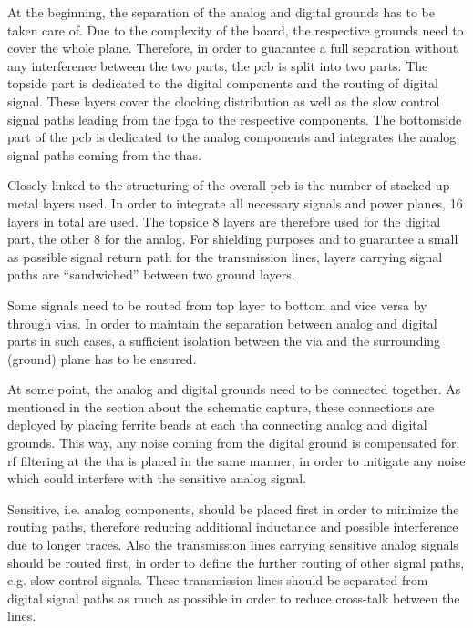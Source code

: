 At the beginning, the separation of the analog and digital grounds has to be taken care of. 
Due to the complexity of the board, the respective grounds need to cover the whole plane. 
Therefore, in order to guarantee a full separation without any interference between the two parts, the \gls{pcb} is split into two parts.
The topside part is dedicated to the digital components and the routing of digital signal. 
These layers cover the clocking distribution as well as the slow control signal paths leading from the \gls{fpga} to the respective components.
The bottomside part of the \gls{pcb} is dedicated to the analog components and integrates the analog signal paths coming from the \glspl{tha}.

Closely linked to the structuring of the overall \gls{pcb} is the number of stacked-up metal layers used.
In order to integrate all necessary signals and power planes, 16 layers in total are used.
The topside 8 layers are therefore used for the digital part, the other 8 for the analog.
For shielding purposes and to guarantee a small as possible signal return path for the transmission lines, layers carrying signal paths are ``sandwiched'' between two ground layers.

Some signals need to be routed from top layer to bottom and vice versa by through vias. 
In order to maintain the separation between analog and digital parts in such cases, a sufficient isolation between the via and the surrounding (ground) plane has to be ensured.

At some point, the analog and digital grounds need to be connected together. 
As mentioned in the section about the schematic capture, these connections are deployed by placing ferrite beads at each \gls{tha} connecting analog and digital grounds.
This way, any noise coming from the digital ground is compensated for. 
\gls{rf} filtering at the \gls{tha} is placed in the same manner, in order to mitigate any noise which could interfere with the sensitive analog signal.

Sensitive, i.e. analog components, should be placed first in order to minimize the routing paths, therefore reducing additional inductance and possible interference due to longer traces.
Also the transmission lines carrying sensitive analog signals should be routed first, in order to define the further routing of other signal paths, e.g. slow control signals. 
These transmission lines should be separated from digital signal paths as much as possible in order to reduce cross-talk between the lines. 

